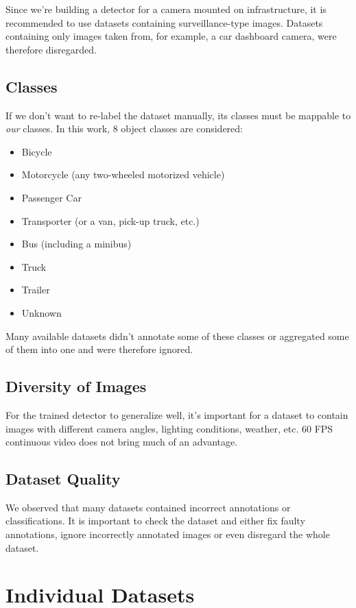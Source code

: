 Since we're building a detector for a camera mounted on infrastructure, it is
recommended to use datasets containing surveillance-type images. Datasets
containing only images taken from, for example, a car dashboard camera, were
therefore disregarded.

\subsection*{Classes}
\label{Classes}

If we don't want to re-label the dataset manually, its classes must be mappable
to \textit{our} classes. In this work, 8 object classes are considered:
\begin{itemize}
    \item Bicycle
    \item Motorcycle (any two-wheeled motorized vehicle)
    \item Passenger Car
    \item Transporter (or a van, pick-up truck, etc.)
    \item Bus (including a minibus)
    \item Truck
    \item Trailer
    \item Unknown
\end{itemize}

Many available datasets didn't annotate some of these classes or aggregated some of them into one
and were therefore ignored.

\subsection*{Diversity of Images}

For the trained detector to generalize well, it's important for a dataset to
contain images with different camera angles, lighting conditions, weather, etc.
60 FPS continuous video does not bring much of an advantage.

\subsection*{Dataset Quality}

We observed that many datasets contained incorrect annotations or
classifications. It is important to check the dataset and either fix faulty
annotations, ignore incorrectly annotated images or even disregard the whole
dataset.



\section{Individual Datasets}

